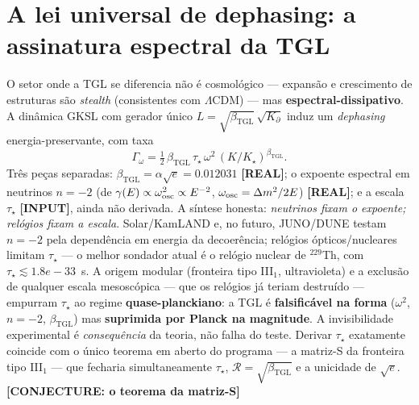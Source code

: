 \documentclass[12pt,a4paper]{article}
\newcommand{\betatgl}{\beta_{\text{TGL}}}
\newcommand{\TGL}{\textsc{TGL}}
\begin{document}
\section{A lei universal de dephasing: a assinatura espectral da \TGL}
\label{sec:dephasing}
O setor onde a \TGL{} se diferencia não é cosmológico --- expansão e crescimento de estruturas são \emph{stealth} (consistentes com $\Lambda$CDM) --- mas \textbf{espectral-dissipativo}.  A dinâmica GKSL com gerador único $L=\sqrt{\betatgl}\,\sqrt{K_\partial}$ induz um \emph{dephasing} energia-preservante, com taxa
\begin{equation}
\Gamma_\omega=\tfrac12\,\betatgl\,\tau_\star\,\omega^2\,(K/K_\star)^{\betatgl}.
\end{equation}
Três peças separadas: $\betatgl=\alpha\sqrt e=0.012031$ \textbf{[REAL]}; o expoente espectral em neutrinos $n=-2$ (de $\gamma(E)\propto\omega_{\rm osc}^2\propto E^{-2}$, $\omega_{\rm osc}=\Delta m^2/2E$) \textbf{[REAL]}; e a escala $\tau_\star$ \textbf{[INPUT]}, ainda não derivada.  A síntese honesta: \emph{neutrinos fixam o expoente; relógios fixam a escala}.  Solar/KamLAND e, no futuro, JUNO/DUNE testam $n=-2$ pela dependência em energia da decoerência; relógios ópticos/nucleares limitam $\tau_\star$ --- o melhor sondador atual é o relógio nuclear de $^{229}$Th, com $\tau_\star\lesssim 1.8e-33$~s.  A origem modular (fronteira tipo III$_1$, ultravioleta) e a exclusão de qualquer escala mesoscópica --- que os relógios já teriam destruído --- empurram $\tau_\star$ ao regime \textbf{quase-planckiano}: a \TGL{} é \textbf{falsificável na forma} ($\omega^2$, $n=-2$, $\betatgl$) mas \textbf{suprimida por Planck na magnitude}.  A invisibilidade experimental é \emph{consequência} da teoria, não falha do teste.  Derivar $\tau_\star$ exatamente coincide com o único teorema em aberto do programa --- a matriz-S da fronteira tipo III$_1$ --- que fecharia simultaneamente $\tau_\star$, $\mathcal R=\sqrt{\betatgl}$ e a unicidade de $\sqrt e$.  \textbf{[CONJECTURE: o teorema da matriz-S]}
\end{document}
